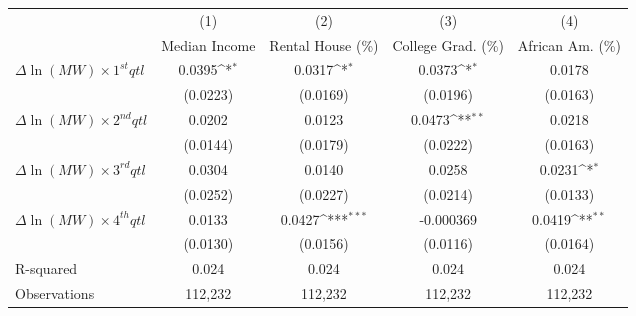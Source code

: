 {
\def\sym#1{\ifmmode^{#1}\else\(^{#1}\)\fi}
\begin{tabular}{l*{4}{c}}
\hline\hline
          &\multicolumn{1}{c}{(1)}&\multicolumn{1}{c}{(2)}&\multicolumn{1}{c}{(3)}&\multicolumn{1}{c}{(4)}\\
          &\multicolumn{1}{c}{Median Income}&\multicolumn{1}{c}{Rental House (\%)}&\multicolumn{1}{c}{College Grad. (\%)}&\multicolumn{1}{c}{African Am. (\%)}\\
\hline
$\Delta \ln(MW) \times 1^{st} qtl$&   0.0395\sym{*}  &   0.0317\sym{*}  &   0.0373\sym{*}  &   0.0178         \\
          & (0.0223)         & (0.0169)         & (0.0196)         & (0.0163)         \\
[1em]
$\Delta \ln(MW) \times 2^{nd} qtl$&   0.0202         &   0.0123         &   0.0473\sym{**} &   0.0218         \\
          & (0.0144)         & (0.0179)         & (0.0222)         & (0.0163)         \\
[1em]
$\Delta \ln(MW) \times 3^{rd} qtl$&   0.0304         &   0.0140         &   0.0258         &   0.0231\sym{*}  \\
          & (0.0252)         & (0.0227)         & (0.0214)         & (0.0133)         \\
[1em]
$\Delta \ln(MW) \times 4^{th} qtl$&   0.0133         &   0.0427\sym{***}&-0.000369         &   0.0419\sym{**} \\
          & (0.0130)         & (0.0156)         & (0.0116)         & (0.0164)         \\
\hline
R-squared &    0.024         &    0.024         &    0.024         &    0.024         \\
Observations&  112,232         &  112,232         &  112,232         &  112,232         \\
\hline\hline
\end{tabular}
}
